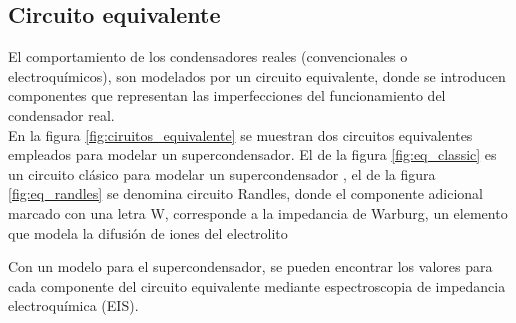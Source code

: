 \subsection{Circuito equivalente}
El comportamiento de los condensadores reales (convencionales o electroquímicos), son modelados por un circuito equivalente, donde se introducen componentes que representan las imperfecciones del funcionamiento del condensador real.\\
En la figura \ref{fig:ciruitos_equivalente} se muestran dos circuitos equivalentes empleados para modelar un supercondensador. El de la figura \ref{fig:eq_classic} es un circuito clásico para modelar un supercondensador \citep{Spyker2000}, el de la figura \ref{fig:eq_randles} se denomina circuito Randles, donde el componente adicional marcado con una  letra W, corresponde a la impedancia de Warburg, un elemento que modela la difusión de iones del electrolito \citep{Wang2009}

Con un modelo para el supercondensador, se pueden encontrar los valores para cada componente del circuito equivalente mediante espectroscopia de impedancia electroquímica (EIS).

